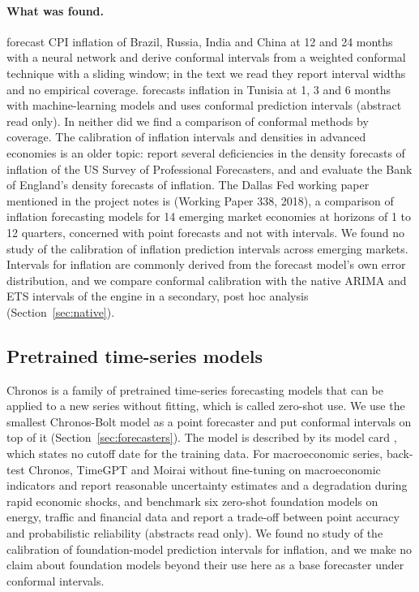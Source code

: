 \paragraph{What was found.} \citet{sengupta2025fewnet} forecast CPI inflation of Brazil, Russia, India and China at 12 and 24 months with a neural network and derive conformal intervals from a weighted conformal technique with a sliding window; in the text we read they report interval widths and no empirical coverage. \citet{brahem2026tunisia} forecasts inflation in Tunisia at 1, 3 and 6 months with machine-learning models and uses conformal prediction intervals (abstract read only). In neither did we find a comparison of conformal methods by coverage. The calibration of inflation intervals and densities in advanced economies is an older topic: \citet{diebold1997spf} report several deficiencies in the density forecasts of inflation of the US Survey of Professional Forecasters, and \citet{wallis2003fancharts} and \citet{clements2004boe} evaluate the Bank of England's density forecasts of inflation. The Dallas Fed working paper mentioned in the project notes is \citet{duncan2019emerging} (Working Paper 338, 2018), a comparison of inflation forecasting models for 14 emerging market economies at horizons of 1 to 12 quarters, concerned with point forecasts and not with intervals. We found no study of the calibration of inflation prediction intervals across emerging markets. Intervals for inflation are commonly derived from the forecast model's own error distribution, and we compare conformal calibration with the native ARIMA and ETS intervals of the engine in a secondary, post hoc analysis (Section~\ref{sec:native}).

\subsection{Pretrained time-series models}

Chronos \citep{ansari2024chronos} is a family of pretrained time-series forecasting models that can be applied to a new series without fitting, which is called zero-shot use. We use the smallest Chronos-Bolt model as a point forecaster and put conformal intervals on top of it (Section~\ref{sec:forecasters}). The model is described by its model card \citep{amazon2024chronosbolt}, which states no cutoff date for the training data. For macroeconomic series, \citet{jetwiriyanon2025zeroshot} back-test Chronos, TimeGPT and Moirai without fine-tuning on macroeconomic indicators and report reasonable uncertainty estimates and a degradation during rapid economic shocks, and \citet{michael2026tsfm} benchmark six zero-shot foundation models on energy, traffic and financial data and report a trade-off between point accuracy and probabilistic reliability (abstracts read only). We found no study of the calibration of foundation-model prediction intervals for inflation, and we make no claim about foundation models beyond their use here as a base forecaster under conformal intervals.

